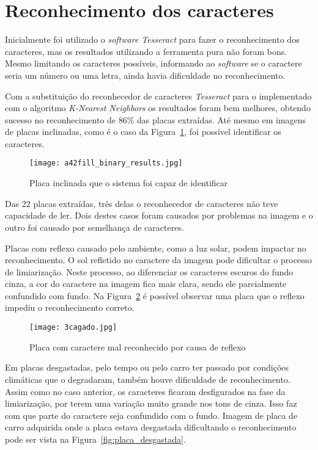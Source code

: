 \section{Reconhecimento dos caracteres}
\label{sec:reconhecimento_dos_caracteres_resultados}

Inicialmente foi utilizado o \emph{software Tesseract} para fazer o
reconhecimento dos caracteres, mas os resultados utilizando a ferramenta pura
não foram bons. Mesmo limitando os caracteres possíveis, informando ao
\emph{software} se o caractere seria um número ou uma letra, ainda havia
dificuldade no reconhecimento.

Com a substituição do reconhecedor de caracteres \emph{Tesseract} para o
implementado com o algoritmo \emph{K-Nearest Neighbors} os resultados foram bem
melhores, obtendo sucesso no reconhecimento de 86\% das placas extraídas. Até
mesmo em imagens de placas inclinadas, como é o caso da
Figura~\ref{fig:plate_torta_result}, foi possível identificar os caracteres.

\begin{figure}[H]
	\centering
	\texttt{[image: a42fill\_binary\_results.jpg]}
	\caption{Placa inclinada que o sistema foi capaz de identificar}
	\label{fig:plate_torta_result}
\end{figure}

Das 22 placas extraídas, três delas o reconhecedor de caracteres não teve
capacidade de ler. Dois destes casos foram causados por problemas na imagem e o outro
foi causado por semelhança de caracteres.

Placas com reflexo causado pelo ambiente, como a luz solar, podem impactar no
reconhecimento. O sol refletido no caractere da imagem pode dificultar o
processo de limiarização. Neste processo, ao diferenciar os caracteres escuros
do fundo cinza, a cor do caractere na imagem fica mais clara, sendo ele
parcialmente confundido com fundo. Na Figura~\ref{fig:cagado_reflexo} é possível
observar uma placa que o reflexo impediu o reconhecimento correto.

\begin{figure}[H]
	\centering
	\texttt{[image: 3cagado.jpg]}
	\caption{Placa com caractere mal reconhecido por causa de reflexo}
	\label{fig:cagado_reflexo}
\end{figure}

Em placas desgastadas, pelo tempo ou pelo carro ter passado por condições
climáticas que o degradaram, também houve dificuldade de reconhecimento. Assim
como no caso anterior, os caracteres ficaram desfigurados na fase da
limiarização, por terem uma variação muito grande nos tons de cinza. Isso faz
com que parte do caractere seja confundido com o fundo. Imagem de placa de carro
adquirida onde a placa estava desgastada dificultando o reconhecimento pode ser
vista na Figura~\ref{fig:placa_desgastada}.

